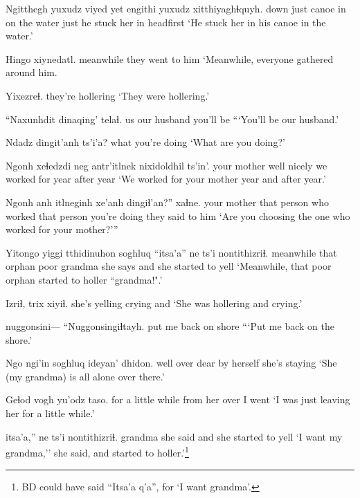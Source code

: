 \documentclass[12pt]{article}
\begin{document}
\gll Ngitthegh yuxudz viyed yet engithi       yuxudz xitthiyaghɬquyh.
down     just     canoe in  {on the water} just   {he stuck her in headfirst}
\glt `He stuck her in his canoe in the water.'
\glend

\gll Hingo     xiynedatl.                    
meanwhile {they went to him}  
\glt `Meanwhile, everyone gathered around him. 
\glend
 
\gll Yixezreɬ.
{{they're hollering}}
\glt `They were hollering.'
\glend

\gll ``Naxunhdit dinaqing' telaɬ. 
us        {our husband} {you'll be}
\glt ```You'll be our husband.'
\glend

\gll Ndadz dingit'anh ts'i'a?
what  {you're doing}
\glt `What are you doing?'
\glend

\gll Ngonh       xeɬedzdi neg    antr'itlnek {nixidoldhil ts'in'.}
{your mother} well   nicely {we worked for} {year after year}
\glt `We worked for your mother year and after year.'
\glend

\gll Ngonh       anh itlneginh  xe'anh  dingiɬ'an?''      xaɬne.
{your mother} {that person} {who worked} {that person} {you're doing} {they said to him}
\glt `Are you choosing the one who worked for your mother?'''
\glend

\gll Yitongo   yiggi tthidinuhon soghluq ``itsa'a''  ne       ts'i nontithizriɬ. 
meanwhile that  orphan      poor    grandma {she says}     and {she started to yell}
\glt `Meanwhile, that poor orphan started to holler ``grandma!".'
\glend

\gll Izriɬ,        trix   xiyiɬ.
{she's yelling} crying and
\glt `She was hollering and crying.'
\glend

\gll nuggonsini--- ``Nuggonsingiɬtayh.
{} {{put me back on shore}     }
\glt ```Put me back on the shore.'
\glend

\gll Ngo ngi'in soghluq ideyan' dhidon. 
well over  dear    {by herself} {she's staying }
\glt `She (my grandma) is all alone over there.'
\glend

\gll Geɬod  vogh            yu'odz taso.
{for a little while} {from her} over {I went}
\glt `I was just leaving her for a little while.'
\glend

 itsa'a,''     ne       ts'i nontithizriɬ.
{} grandma {she said} and  {she started to yell}
\glt `I want my grandma,'' she said, and started to holler.'\footnote{BD could have said ``Itsa'a q'a'', for `I want grandma'.}
\glend
\end{document}
